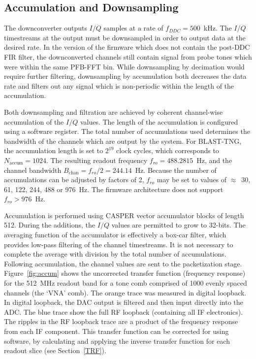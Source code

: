 \subsection{Accumulation and Downsampling}\label{accum}

The downconverter outputs $I/Q$ samples at a rate of $f_{DDC} = 500$~kHz. The $I/Q$ timestreams at the output must be downsampled in order to output data at the desired rate. In the version of the firmware which does not contain the post-DDC FIR filter, the downconverted channels still contain signal from probe tones which were within the same PFB-FFT bin. While downsampling by decimation would require further filtering, downsampling by accumulation both decreases the data rate and filters out any signal which is non-periodic within the length of the accumulation.

Both downsampling and filtration are achieved by coherent channel-wise accumulation of the $I/Q$ values. The length of the accumulation is configured using a software register. The total number of accumulations used determines the bandwidth of the channels which are output by the system. For BLAST-TNG, the accumulation length is set to $2^{19}$ clock cycles, which corresponds to $N_{\mathrm{accum}} = 1024$. The resulting readout frequency $f_{ro} = 488.2815$~Hz, and the channel bandwidth $B_{\mathrm{chan}} = f_{ro}/2 = 244.14$~Hz. Because the number of accumulations can be adjusted by factors of 2, $f_{ro}$ may be set to values of $\approx$~30, 61, 122, 244, 488 or 976~Hz. The firmware architecture does not support $f_{ro} > 976$~Hz.

Accumulation is performed using CASPER vector accumulator blocks of length 512. During the additions, the $I/Q$ values are permitted to grow to 32-bits. The averaging function of the accumulator is effectively a box-car filter, which provides low-pass filtering of the channel timestreams. It is not necessary to complete the average with division by the total number of accumulations. Following accumulation, the channel values are sent to the packetization stage. Figure~\ref{fig:accum} shows the uncorrected transfer function (frequency response) for the 512~MHz readout band for a tone comb comprised of 1000 evenly spaced channels (the `VNA' comb). The orange trace was measured in digital loopback. In digital loopback, the DAC output is filtered and then input directly into the ADC. The blue trace show the full RF loopback (containing all IF electronics). The ripples in the RF loopback trace are a product of the frequency response from each IF component. This transfer function can be corrected for using software, by calculating and applying the inverse transfer function for each readout slice (see Section~\ref{TRF}).

